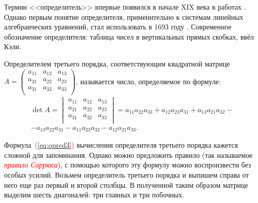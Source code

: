 \documentclass[10pt]{article}
\newenvironment{defnt}%
{\begin{center}\fboxsep=1.6\fboxrule \shadowsize=4pt\begin{Sbox}
\begin{minipage}[c]{0.58\textwidth}}%
{\end{minipage}\end{Sbox}\shadowbox{\fboxsep=5pt\colorbox[rgb]{1,0.725,0.474}{\TheSbox}}
\end{center}}
\numberwithin{primer}{section}
\newcommand{\term}[1]{\textcolor{red}{\emph{#1}}}
\numberwithin{equation}{section}
\newcommand{\refform}[1]{\textcolor{red}{(\ref{#1})}}
\begin{document}
Термин <<определитель>> впервые появился в начале XIX века в
работах . Однако первым понятие определителя, применительно к
системам линейных алгебраических уравнений, стал использовать в 1693
году . Современное обозначение определителя:
таблица чисел в вертикальных прямых скобках, ввёл Кэли.

\begin{defnt}
Определителем третьего порядка, соответствующим квадратной матрице
$A=\begin{pmatrix}
  a_{11} & a_{12} & a_{13}\\
  a_{21} & a_{22} & a_{23}\\
  a_{31} & a_{32} & a_{33}\\
\end{pmatrix}$,
называется число, определяемое по формуле: \begin{multline}\label{eq:opred3}
\det A=\begin{vmatrix}
  a_{11} & a_{12} & a_{13}\\
  a_{21} & a_{22} & a_{23}\\
  a_{31} & a_{32} & a_{33}\\
\end{vmatrix}
=a_{11}a_{22}a_{33}+a_{12}a_{23}a_{31}+a_{13}a_{21}a_{32}-\\
-a_{13}a_{22}a_{31}-a_{11}a_{23}a_{32}-a_{12}a_{21}a_{33}.
\end{multline}
\end{defnt}

Формула~\refform{eq:opred3} вычисления определителя третьего порядка кажется
сложной для запоминания. Однако можно предложить правило
(так называемое \term{правило Саррюса}), с
помощью которого эту формулу можно воспроизвести без особых
усилий. Возьмем определитель третьего порядка и выпишем справа от
него еще раз первый и второй столбцы. В полученной таким образом
матрице выделим шесть диагоналей: три главных и три побочных.
\end{document}
